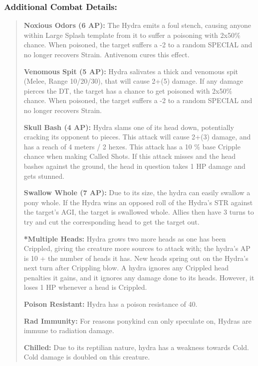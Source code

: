 \documentclass[11pt,a4paper,twocolumn]{book}
\begin{document}
	\subsubsection*{Additional Combat Details: }
	\begin{verse}
		\textbf{Noxious Odors (6 AP):} The Hydra emits a foul stench, causing anyone within Large Splash template from it to suffer a poisoning with 2x50\% chance. When poisoned, the target suffers  a -2 to a random SPECIAL and no longer recovers Strain. Antivenom cures this effect.
		
		\textbf{Venomous Spit (5 AP):} Hydra salivates a thick and venomous spit (Melee, Range 10/20/30), that will cause 2+(5) damage. If any damage pierces the DT, the target has a chance to get poisoned with 2x50\% chance. When poisoned, the target suffers  a -2 to a random SPECIAL and no longer recovers Strain. 
		
		\textbf{Skull Bash (4 AP):} Hydra slams one of its head down, potentially cracking its opponent to pieces. This attack will cause 2+(3) damage, and has a reach of 4 meters / 2 hexes. This attack has a 10 \% base Cripple chance when making Called Shots. If this attack misses and the head bashes against the ground, the head in question takes 1 HP damage and gets stunned.
		
		\textbf{Swallow Whole (7 AP):} Due to its size, the hydra can easily swallow a pony whole. If the Hydra wins an opposed roll of the Hydra's STR against the target's AGI, the target is swallowed whole. Allies then have 3 turns to try and cut the corresponding head to get the target out.
		
		\textbf{*Multiple Heads:} Hydra grows two more heads as one has been Crippled, giving the creature more sources to attack with; the hydra's AP is 10 + the number of heads it has. New heads spring out on the Hydra's next turn after Crippling blow. A hydra ignores any Crippled head penalties it gains, and it ignores any damage done to its heads. However, it loses 1 HP whenever a head is Crippled.
		
		\textbf{Poison Resistant:} Hydra has a poison resistance of 40.
		
		\textbf{Rad Immunity:} For reasons ponykind can only speculate on, Hydras are immune to radiation damage.
		
		\textbf{Chilled:} Due to its reptilian nature, hydra has a weakness towards Cold. Cold damage is doubled on this creature.
	\end{verse}
	
\end{document}

